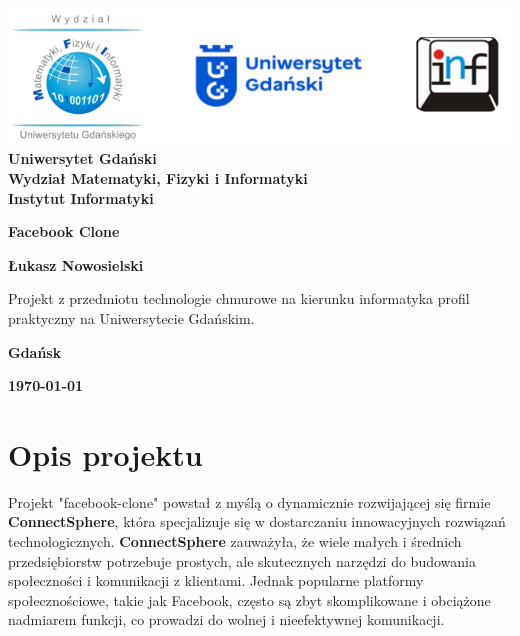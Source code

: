 \documentclass[12pt,a4paper]{article}
\newcommand{\hmwkTitle}{Facebook Clone} %
\newcommand{\hmwkDueDate}{\today} %
\newcommand{\hmwkAuthorName}{Łukasz Nowosielski} %
\begin{document}
\begin{titlepage}
    \vfill
	\begin{center}
	\hspace*{-1cm}
	\vspace*{0.5cm}
    \includegraphics[scale=0.55]{imagens/loga.png}\\
	\textbf{Uniwersytet Gdański \\ [0.05cm]Wydział Matematyki, Fizyki i Informatyki \\ [0.05cm] Instytut Informatyki}

	\vspace{0.6cm}
	\vspace{4cm}
	{\huge \textbf{\hmwkTitle}}\vspace{8mm}
	
	{\large \textbf{\hmwkAuthorName}}\\[3cm]
	
		\hspace{.45\textwidth} %
	   \begin{minipage}{.5\textwidth}
	   Projekt z przedmiotu technologie chmurowe na kierunku informatyka profil praktyczny na Uniwersytecie Gdańskim.\\[0.1cm]
	  \end{minipage}
	  \vfill
	
	\textbf{Gdańsk}
	
	\textbf{\hmwkDueDate}
	\end{center}
	
\end{titlepage}

\newpage
\setcounter{secnumdepth}{5}
\tableofcontents
\newpage

\section{Opis projektu}
\label{sec:Project}

Projekt "facebook-clone" powstał z myślą o dynamicznie rozwijającej się firmie \textbf{ConnectSphere}, która specjalizuje się w dostarczaniu innowacyjnych rozwiązań technologicznych. \textbf{ConnectSphere} zauważyła, że wiele małych i średnich przedsiębiorstw potrzebuje prostych, ale skutecznych narzędzi do budowania społeczności i komunikacji z klientami. Jednak popularne platformy społecznościowe, takie jak Facebook, często są zbyt skomplikowane i obciążone nadmiarem funkcji, co prowadzi do wolnej i nieefektywnej komunikacji.
\end{document}
